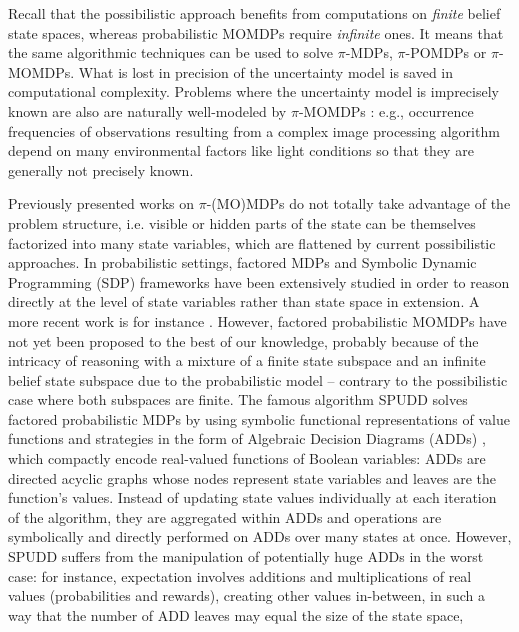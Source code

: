 Recall that the possibilistic approach benefits from computations 
on \emph{finite} belief state spaces, 
whereas probabilistic MOMDPs require \emph{infinite} ones. 
It means that the same algorithmic techniques can be used to solve $\pi$-MDPs,
$\pi$-POMDPs or $\pi$-MOMDPs. 
What is lost in precision of the uncertainty model is saved 
in computational complexity. Problems where the uncertainty model is
imprecisely known are also are naturally well-modeled by $\pi$-MOMDPs \cite{Drougard13}: 
e.g., occurrence frequencies of observations resulting from a complex
image processing algorithm depend on many environmental factors like light
conditions so that they are generally not precisely known.

Previously presented works on $\pi$-(MO)MDPs do not totally take advantage of
the problem structure, i.e. visible or hidden parts of the state can be
themselves factorized into many state variables, which are flattened by
current possibilistic approaches. In probabilistic settings, factored MDPs 
and Symbolic Dynamic Programming (SDP) frameworks
\cite{DBLP:journals/ai/BoutilierDG00,Hoey99spudd:stochastic} have been
extensively studied in order to reason directly at the level of state variables
rather than state space in extension.
A more recent work is for instance \cite{DBLP:conf/ecai/RadoszyckiPS14}. 
However, factored probabilistic
MOMDPs have not yet been proposed to the best of our knowledge, probably because
of the intricacy of reasoning with a mixture of a finite state subspace and an
infinite belief state subspace due to the probabilistic model -- contrary to the
possibilistic case where both subspaces are finite. The famous algorithm SPUDD
\cite{Hoey99spudd:stochastic} solves factored probabilistic MDPs by using
symbolic functional representations of value functions and strategies in the form
of Algebraic Decision Diagrams (ADDs) \cite{Bahar:1997:ADD}, which compactly
encode real-valued functions of Boolean variables: ADDs are directed acyclic
graphs whose nodes represent state variables and leaves are the function's
values. Instead of updating state values individually at each iteration of the
algorithm, they are aggregated within ADDs and operations are symbolically and
directly performed on ADDs over many states at once. However, SPUDD suffers from the manipulation of
potentially huge ADDs in the worst case: for instance,
expectation involves additions and multiplications of real values (probabilities
and rewards), creating other values in-between, in such a way that the number of
ADD leaves may equal the size of the state space, 
